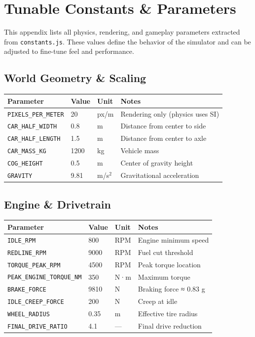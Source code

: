 \section{Tunable Constants \& Parameters}

This appendix lists all physics, rendering, and gameplay parameters extracted from \texttt{constants.js}. These values define the behavior of the simulator and can be adjusted to fine-tune feel and performance.

\subsection{World Geometry \& Scaling}

\begin{table}[h]
  \centering
  \small
  \begin{tabular}{llll}
    \toprule
    \textbf{Parameter} & \textbf{Value} & \textbf{Unit} & \textbf{Notes} \\
    \midrule
    \texttt{PIXELS\_PER\_METER} & 20 & px/m & Rendering only (physics uses SI) \\
    \texttt{CAR\_HALF\_WIDTH} & 0.8 & m & Distance from center to side \\
    \texttt{CAR\_HALF\_LENGTH} & 1.5 & m & Distance from center to axle \\
    \texttt{CAR\_MASS\_KG} & 1200 & kg & Vehicle mass \\
    \texttt{COG\_HEIGHT} & 0.5 & m & Center of gravity height \\
    \texttt{GRAVITY} & 9.81 & m/s$^2$ & Gravitational acceleration \\
    \bottomrule
  \end{tabular}
\end{table}

\subsection{Engine \& Drivetrain}

\begin{table}[h]
  \centering
  \small
  \begin{tabular}{llll}
    \toprule
    \textbf{Parameter} & \textbf{Value} & \textbf{Unit} & \textbf{Notes} \\
    \midrule
    \texttt{IDLE\_RPM} & 800 & RPM & Engine minimum speed \\
    \texttt{REDLINE\_RPM} & 9000 & RPM & Fuel cut threshold \\
    \texttt{TORQUE\_PEAK\_RPM} & 4500 & RPM & Peak torque location \\
    \texttt{PEAK\_ENGINE\_TORQUE\_NM} & 350 & N·m & Maximum torque \\
    \texttt{BRAKE\_FORCE} & 9810 & N & Braking force ≈ 0.83 g \\
    \texttt{IDLE\_CREEP\_FORCE} & 200 & N & Creep at idle \\
    \texttt{WHEEL\_RADIUS} & 0.35 & m & Effective tire radius \\
    \texttt{FINAL\_DRIVE\_RATIO} & 4.1 & — & Final drive reduction \\
    \bottomrule
  \end{tabular}
\end{table}

